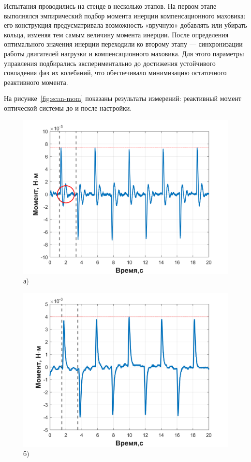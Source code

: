  Испытания проводились на стенде в несколько этапов. На первом этапе выполнялся эмпирический подбор момента инерции компенсационного маховика: его конструкция предусматривала возможность «вручную» добавлять или убирать кольца, изменяя тем самым величину момента инерции. После определения оптимального значения инерции переходили ко второму этапу — синхронизации работы двигателей нагрузки и компенсационного маховика. Для этого параметры управления подбирались экспериментально до достижения устойчивого совпадения фаз их колебаний, что обеспечивало минимизацию остаточного реактивного момента. 
 
 На рисунке~\cref{fig:scan-mom} показаны результаты измерений: реактивный момент оптической системы до и после настройки.
 
 \begin{figure}[h!]
 	\begin{minipage}[b]{0.49\linewidth}\centering
 		\includegraphics[width=1\linewidth]{matlab/img/scanner_no_sinchron} \\ а)
 	\end{minipage}
 	\hfill
 	\begin{minipage}[b]{0.49\linewidth}\centering
 		\includegraphics[width=1\linewidth]{matlab/img/scanner_correct} \\ б)

\end{minipage}
\end{figure}
